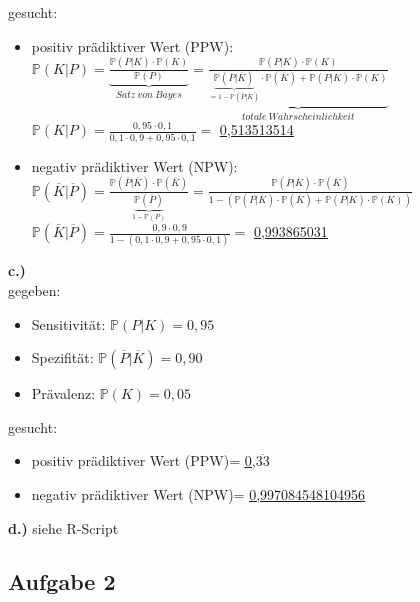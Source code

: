 \documentclass[13pt,a4paper]{article}
\begin{document}
gesucht:\\
\begin{itemize}
	\item positiv prädiktiver Wert (PPW): \\
	$\mathbb{P}(K|P) = \underbrace{\frac{\mathbb{P}(P|K) \cdot \mathbb{P}(K)}{\mathbb{P}(P)}}_{Satz\ von\ Bayes} = \underbrace{\frac{\mathbb{P}(P|K) \cdot \mathbb{P}(K)}{\underbrace{\mathbb{P}(P|\overline{K})}_{=1-\mathbb{P}(\overline{P}|\overline{K})} \cdot \mathbb{P}(\overline{K}) + \mathbb{P}(P|K) \cdot \mathbb{P}(K)}}_{totale\ Wahrscheinlichkeit}$\\
	$\mathbb{P}(K|P) = \frac{0,95 \cdot 0,1}{0,1 \cdot 0,9 + 0,95 \cdot 0,1} = $ \underline{\underline{0,513513514}}
	\item negativ prädiktiver Wert (NPW):\\
	$\mathbb{P}(\overline{K}|\overline{P})= \frac{\mathbb{P}(\overline{P}|\overline{K}) \cdot \mathbb{P}(\overline{K})}{\underbrace{\mathbb{P}(\overline{P})}_{1-\mathbb{P}(P)}} = \frac{\mathbb{P}(\overline{P}|\overline{K}) \cdot \mathbb{P}(\overline{K})}{1 - (\mathbb{P}(P|\overline{K}) \cdot \mathbb{P}(\overline{K}) + \mathbb{P}(P|K) \cdot \mathbb{P}(K))}$\\
	$\mathbb{P}(\overline{K}|\overline{P})= \frac{0,9 \cdot 0,9}{1-(0,1 \cdot 0,9 + 0,95 \cdot 0,1)} =$ \underline{\underline{0,993865031}}
\end{itemize}

\textbf{c.)}
\\
gegeben:
\begin{itemize}
	\item Sensitivität: $\mathbb{P}(P|K)=0,95$
	\item Spezifität: $\mathbb{P}(\overline{P}|\overline{K})=0,90$
	\item Prävalenz: $\mathbb{P}(K)=0,05$
\end{itemize}

gesucht:\\
\begin{itemize}
	\item positiv prädiktiver Wert (PPW)= \underline{\underline{0,$\overline{33}$}}
	\item negativ prädiktiver Wert (NPW)= \underline{\underline{0,997084548104956}}
\end{itemize}

\textbf{d.)}
siehe R-Script

\subsection{Aufgabe 2}
\end{document}

